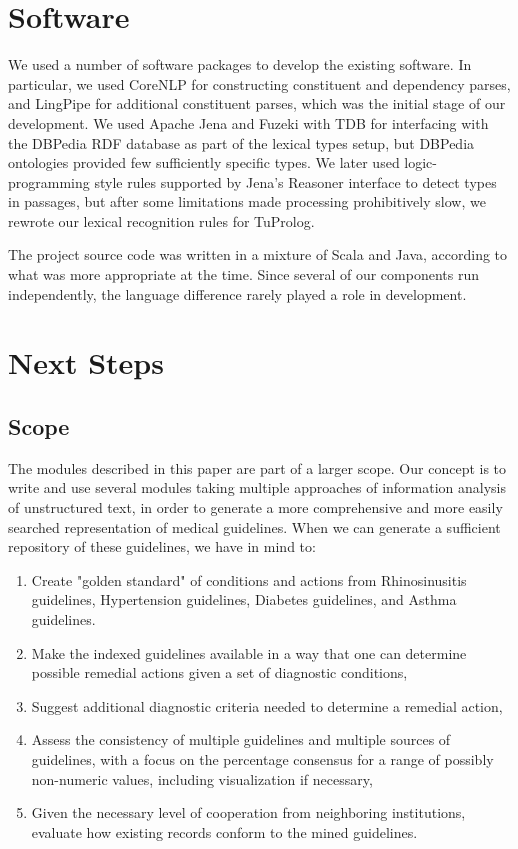 \documentclass[12pt,letterpaper]{article}
\begin{document}
\section{Software}

We used a number of software packages to develop the existing software. In particular, we used CoreNLP \cite{manning-EtAl:2014:P14-5} for constructing constituent and dependency parses, and LingPipe for additional constituent parses, which was the initial stage of our development.
We used Apache Jena and Fuzeki with TDB for interfacing with the DBPedia RDF database as part of the lexical types setup, but DBPedia ontologies provided few sufficiently specific types. We later used logic-programming style rules supported by Jena's Reasoner interface to detect types in passages, but after some limitations made processing prohibitively slow, we rewrote our lexical recognition rules for TuProlog. 

The project source code was written in a mixture of Scala and Java, according to what was more appropriate at the time. Since several of our components run independently, the language difference rarely played a role in development.

\section{Next Steps}
\subsection*{Scope}

The modules described in this paper are part of a larger scope. Our concept is to write and use several modules taking multiple approaches of information analysis of unstructured text, in order  to generate a more comprehensive and more easily searched representation of medical guidelines. When we can generate a sufficient repository of these guidelines, we have in mind to:

\begin{enumerate}
\item Create "golden standard" of conditions and actions from Rhinosinusitis guidelines, Hypertension guidelines, Diabetes guidelines, and Asthma guidelines.
\item Make the indexed guidelines available in a way that one can determine possible remedial actions given a set of diagnostic conditions,
\item Suggest additional diagnostic criteria needed to determine a remedial action,
\item Assess the consistency of multiple guidelines and multiple sources of guidelines, with a focus on the percentage consensus for a range of possibly non-numeric values, including visualization if necessary,
\item Given the necessary level of cooperation from neighboring institutions, evaluate how existing records conform to the mined guidelines.
\end{enumerate}
\end{document}
